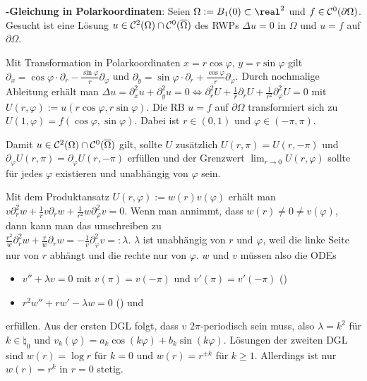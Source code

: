 \textbf{-Gleichung in Polarkoordinaten}:
Seien $\Omega := B_1(0) \subset \real^2$ und $f \in \mathcal{C}^0(\partial\Omega)$.\\
Gesucht ist eine Lösung $u \in \mathcal{C}^2(\Omega) \cap \mathcal{C}^0(\overline{\Omega})$ des RWPs
$\Delta u = 0$ in $\Omega$ und $u = f$ auf $\partial\Omega$.

Mit Transformation in Polarkoordinaten $x = r\cos\varphi$, $y = r\sin\varphi$ gilt
$\partial_x = \cos\varphi \cdot \partial_r - \frac{\sin\varphi}{r} \partial_\varphi$ und
$\partial_y = \sin\varphi \cdot \partial_r + \frac{\cos\varphi}{r} \partial_\varphi$.
Durch nochmalige Ableitung erhält man
$\Delta u = \partial_x^2 u + \partial_y^2 u = 0 \iff
\partial_r^2 U + \frac{1}{r} \partial_r U + \frac{1}{r^2} \partial_\varphi^2 U = 0$
mit $U(r, \varphi) := u(r\cos\varphi, r\sin\varphi)$.
Die RB $u = f$ auf $\partial\Omega$ transformiert sich zu
$U(1, \varphi) = f(\cos\varphi, \sin\varphi)$.
Dabei ist $r \in (0, 1)$ und $\varphi \in (-\pi, \pi)$.

Damit $u \in \mathcal{C}^2(\Omega) \cap \mathcal{C}^0(\overline{\Omega})$ gilt, sollte $U$ zusätzlich
$U(r, \pi) = U(r, -\pi)$ und\\
$\partial_\varphi U(r, \pi) = \partial_\varphi U(r, -\pi)$
erfüllen und der Grenzwert $\lim_{r \to 0} U(r, \varphi)$ sollte für jedes $\varphi$ existieren
und unabhängig von $\varphi$ sein.

Mit dem Produktansatz $U(r, \varphi) := w(r) v(\varphi)$ erhält man
$v \partial_r^2 w + \frac{1}{r} v \partial_r w + \frac{1}{r^2} w \partial_\varphi^2 v = 0$.
Wenn man annimmt, dass $w(r) \not= 0 \not= v(\varphi)$, dann kann man das umschreiben zu\\
$\frac{r^2}{w} \partial_r^2 w + \frac{r}{w} \partial_r w = -\frac{1}{v} \partial_\varphi^2 v =:
\lambda$.
$\lambda$ ist unabhängig von $r$ und $\varphi$, weil die linke Seite nur von $r$ abhängt und
die rechte nur von $\varphi$.
$w$ und $v$ müssen also die ODEs
\begin{itemize}
    \item
    $v'' + \lambda v = 0$
    mit $v(\pi) = v(-\pi)$ und $v'(\pi) = v'(-\pi)$
    ()
    
    \item
    $r^2 w'' + rw' - \lambda w = 0$
    () und
\end{itemize}
erfüllen.
Aus der ersten DGL folgt, dass $v$ $2\pi$-periodisch sein muss,
also $\lambda = k^2$ für $k \in \natural_0$ und
$v_k(\varphi) = a_k \cos(k\varphi) + b_k \sin(k\varphi)$.
Lösungen der zweiten DGL sind $w(r) = \log r$ für $k = 0$ und $w(r) = r^{\pm k}$ für $k \ge 1$.
Allerdings ist nur $w(r) = r^k$ in $r = 0$ stetig.

